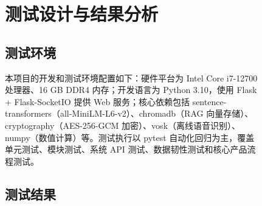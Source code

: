 \documentclass[12pt,a4paper,oneside]{ctexrep}
\begin{document}
\begin{figure}[H]
\chapter{测试设计与结果分析}

\section{测试环境}

本项目的开发和测试环境配置如下：硬件平台为 Intel Core i7-12700 处理器、16 GB DDR4 内存；开发语言为 Python 3.10，使用 Flask + Flask-SocketIO 提供 Web 服务；核心依赖包括 sentence-transformers（all-MiniLM-L6-v2）、chromadb（RAG 向量存储）、cryptography（AES-256-GCM 加密）、vosk（离线语音识别）、numpy（数值计算）等。测试执行以 pytest 自动化回归为主，覆盖单元测试、模块测试、系统 API 测试、数据韧性测试和核心产品流程测试。

\section{测试结果}


\end{figure}
\end{document}
